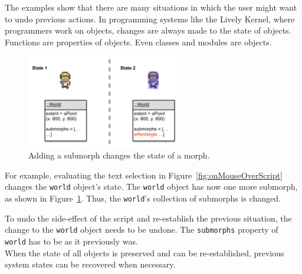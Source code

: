 The examples show that there are many situations in which the user might want to undo previous actions.
In programming systems like the Lively Kernel, where programmers work on objects, changes are always made to the state of objects.
Functions are properties of objects.
Even classes and modules are objects.

\begin{figure}[h]
    \centering
    \includegraphics[width=0.6\textwidth]{figures/3_motivation/5_stateChanges.pdf}
    \caption{Adding a submorph changes the state of a morph.}
    \label{fig:changedCharacter}
\end{figure}

For example, evaluating the text selection in Figure~\ref{fig:onMouseOverScript} changes the \lstinline{world} object's state.
The \lstinline{world} object has now one more submorph, as shown in Figure~\ref{fig:changedCharacter}.
Thus, the \lstinline{world}'s collection of submorphs is changed.

To undo the side-effect of the script and re-establish the previous situation, the change to the \lstinline{world} object needs to be undone.
The \lstinline{submorphs} property of \lstinline{world} has to be as it previously was.\\
When the state of all objects is preserved and can be re-established, previous system states can be recovered when necessary.
